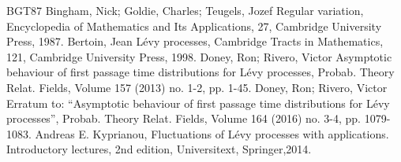 \documentclass[10pt]{amsart}
\theoremstyle{definition}
\numberwithin{equation}{section}
\begin{document}
\begin{thebibliography}{BGT87}
 Bingham, Nick; Goldie, Charles; Teugels, Jozef Regular variation, Encyclopedia of Mathematics and Its Applications, 27, Cambridge University Press, 1987.
 Bertoin, Jean Lévy processes, Cambridge Tracts in Mathematics, 121, Cambridge University Press, 1998.
 Doney, Ron; Rivero, Victor Asymptotic behaviour of first passage time distributions for Lévy processes, Probab. Theory Relat. Fields, Volume 157 (2013) no. 1-2, pp. 1-45.
 Doney, Ron; Rivero, Victor Erratum to: “Asymptotic behaviour of first passage time distributions for Lévy processes”, Probab. Theory Relat. Fields, Volume 164 (2016) no. 3-4, pp. 1079-1083.
 Andreas E. Kyprianou, Fluctuations of Lévy processes with applications. Introductory lectures, 2nd edition, Universitext, Springer,2014.
\end{thebibliography}
\end{document}
